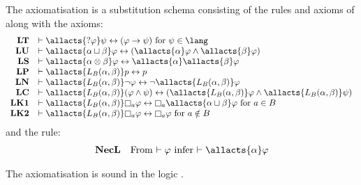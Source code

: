 \begin{definition}\label{afl-k-axioms}
The axiomatisation \axiomAflK{} is a substitution schema consisting of the rules and axioms of \axiomK{} along with the axioms:
$$
\begin{array}{rl}
    {\bf LT} & \proves \allacts{\test{\phi}} \psi \iff (\phi \implies \psi) \text{ for } \psi \in \lang\\
    {\bf LU} & \proves \allacts{\alpha \choice \beta} \phi \iff (\allacts{\alpha} \phi \land \allacts{\beta} \phi)\\
    {\bf LS} & \proves \allacts{\alpha \compose \beta} \phi \iff \allacts{\alpha} \allacts{\beta} \phi\\
    {\bf LP} & \proves \allacts{\learns_\agentsB (\alpha, \beta)} \atomP \iff \atomP\\
    {\bf LN} & \proves \allacts{\learns_\agentsB (\alpha, \beta)} \neg \phi \iff \neg \allacts{\learns_\agentsB (\alpha, \beta)} \phi\\
    {\bf LC} & \proves \allacts{\learns_\agentsB (\alpha, \beta)} (\phi \land \psi) \iff (\allacts{\learns_\agentsB (\alpha, \beta)} \phi \land \allacts{\learns_\agentsB (\alpha, \beta)} \psi)\\
    {\bf LK1} & \proves \allacts{\learns_\agentsB (\alpha, \beta)} \necessaryA \phi \iff \necessaryA \allacts{\alpha \choice \beta} \phi \text{ for } \agentA \in \agentsB\\
    {\bf LK2} & \proves \allacts{\learns_\agentsB (\alpha, \beta)} \necessaryA \phi \iff \necessaryA \phi \text{ for } \agentA \notin \agentsB
\end{array}
$$
and the rule:
$$
\begin{array}{rl}
    {\bf NecL} & \text{From $\proves \phi$ infer $\proves \allacts{\alpha} \phi$}
\end{array}
$$
\end{definition}

\begin{proposition}\label{afl-k-axioms-soundness}
The axiomatisation \axiomAflK{} is sound in the logic \logicAmlK{}.
\end{proposition}

